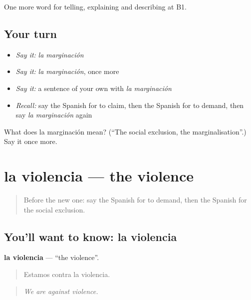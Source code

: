 \begin{grammarlens}[title={What you've built}]
One more word for telling, explaining and describing at B1.
\end{grammarlens}

\subsection*{Your turn}
\begin{itemize}
\raggedright
  \item \emph{Say it:} \emph{la marginación}
  \item \emph{Say it:} \emph{la marginación}, once more
  \item \emph{Say it:} a sentence of your own with \emph{la marginación}
  \item \emph{Recall:} say the Spanish for to claim, then the Spanish for to demand, then say \emph{la marginación} again
\end{itemize}

\begin{tcolorbox}[breakable,colback=teal!4,colframe=teal!35!black,title={Before you move on}]
What does la marginación mean? (\textquotedblleft{}The social exclusion, the marginalisation\textquotedblright{}.) Say it once more.
\end{tcolorbox}
\section[la violencia]{la violencia — the violence}

\label{lesson:ES-C605-violencia}



\begin{quote}
Before the new one: say the Spanish for to demand, then the Spanish for the social exclusion.
\end{quote}

\subsection*{You'll want to know: la violencia}
\textbf{la violencia} — \textquotedblleft{}the violence\textquotedblright{}.

\begin{quote}
Estamos contra la violencia.
\end{quote}

\begin{quote}
\emph{We are against violence.}
\end{quote}

